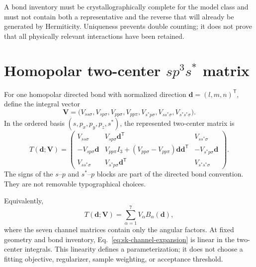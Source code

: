 A bond inventory must be crystallographically complete for the model class and
must not contain both a representative and the reverse that will already be
generated by Hermiticity. Uniqueness prevents double counting; it does not prove
that all physically relevant interactions have been retained.

\section{Homopolar two-center \texorpdfstring{$sp^3s^{\ast}$}{sp3s*} matrix}

For one homopolar directed bond with normalized direction
$\mathbf d=(l,m,n)^{\mathsf T}$, define the integral vector
\begin{equation}
  \mathbf V
  =
  \bigl(
  V_{ss\sigma},
  V_{sp\sigma},
  V_{pp\sigma},
  V_{pp\pi},
  V_{s^{\ast}p\sigma},
  V_{ss^{\ast}\sigma},
  V_{s^{\ast}s^{\ast}\sigma}
  \bigr).
\end{equation}
In the ordered basis $(s,p_x,p_y,p_z,s^{\ast})$, the represented two-center
matrix is
\begin{equation}
  T(\mathbf d;\mathbf V)
  =
  \begin{pmatrix}
    V_{ss\sigma}
      & V_{sp\sigma}\mathbf d^{\mathsf T}
      & V_{ss^{\ast}\sigma} \\
    -V_{sp\sigma}\mathbf d
      & V_{pp\pi}I_3
        +(V_{pp\sigma}-V_{pp\pi})
          \mathbf d\mathbf d^{\mathsf T}
      & -V_{s^{\ast}p\sigma}\mathbf d \\
    V_{ss^{\ast}\sigma}
      & V_{s^{\ast}p\sigma}\mathbf d^{\mathsf T}
      & V_{s^{\ast}s^{\ast}\sigma}
  \end{pmatrix}.
  \label{eq:sk-sp3sstar-matrix}
\end{equation}
The signs of the $s$--$p$ and $s^{\ast}$--$p$ blocks are part of the directed
bond convention. They are not removable typographical choices.

Equivalently,
\begin{equation}
  T(\mathbf d;\mathbf V)
  =
  \sum_{\alpha=1}^{7}V_{\alpha}B_{\alpha}(\mathbf d),
  \label{eq:sk-channel-expansion}
\end{equation}
where the seven channel matrices contain only the angular factors. At fixed
geometry and bond inventory, Eq.~\eqref{eq:sk-channel-expansion} is linear in
the two-center integrals. This linearity defines a parameterization; it does
not choose a fitting objective, regularizer, sample weighting, or acceptance
threshold.


